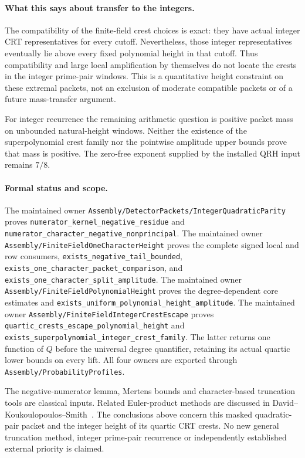 \documentclass[11pt]{article}
\begin{document}
\paragraph{What this says about transfer to the integers.}
The compatibility of the finite-field crest choices is exact:
they have actual integer CRT representatives for every cutoff.
Nevertheless, those integer representatives eventually lie above
every fixed polynomial height in that cutoff. Thus compatibility and
large local amplification by themselves do not locate the crests in
the integer prime-pair windows. This is a quantitative height constraint
on these extremal packets, not an exclusion of moderate compatible
packets or of a future mass-transfer argument.

For integer recurrence the remaining arithmetic question is positive
packet mass on unbounded natural-height windows. Neither the existence
of the superpolynomial crest family nor the pointwise amplitude upper
bounds prove that mass is positive. The zero-free exponent supplied
by the installed QRH input remains \(7/8\).

\paragraph{Formal status and scope.}
The maintained owner
\texttt{Assembly/DetectorPackets/IntegerQuadraticParity} proves
\texttt{numerator\_kernel\_negative\_residue} and
\texttt{numerator\_character\_negative\_nonprincipal}.
The maintained owner \texttt{Assembly/FiniteFieldOneCharacterHeight}
proves the complete signed local and row consumers,
\texttt{exists\_negative\_tail\_bounded},
\texttt{exists\_one\_character\_packet\_comparison}, and
\texttt{exists\_one\_character\_split\_amplitude}.
The maintained owner \texttt{Assembly/FiniteFieldPolynomialHeight}
proves the degree-dependent core estimates and
\texttt{exists\_uniform\_polynomial\_height\_amplitude}.
The maintained owner \texttt{Assembly/FiniteFieldIntegerCrestEscape}
proves \texttt{quartic\_crests\_escape\_polynomial\_height} and
\texttt{exists\_superpolynomial\_integer\_crest\_family}.
The latter returns one function of \(Q\) before the universal degree
quantifier, retaining its actual quartic lower bounds on every lift.
All four owners are exported through
\texttt{Assembly/ProbabilityProfiles}.

The negative-numerator lemma, Mertens bounds and character-based
truncation tools are classical inputs. Related Euler-product methods
are discussed in David--Koukoulopoulos--Smith~\cite{DavidKoukoulopoulosSmith}.
The conclusions above concern this masked quadratic-pair packet and
the integer height of its quartic CRT crests. No new general
truncation method, integer prime-pair recurrence or independently
established external priority is claimed.
\end{document}
